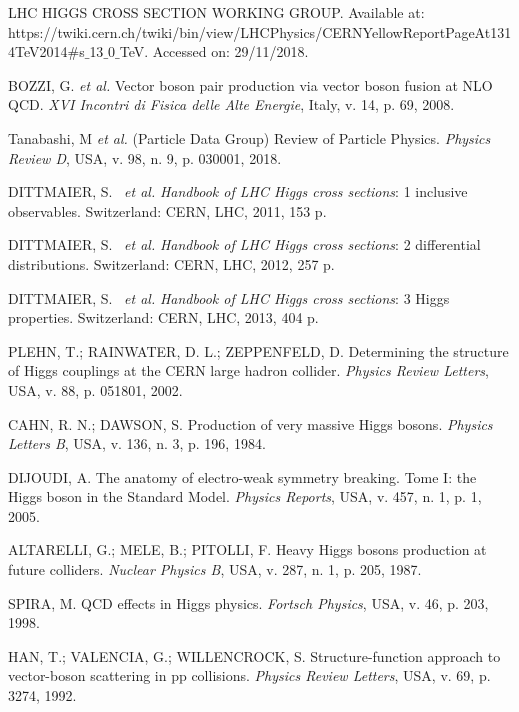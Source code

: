 \begin{thebibliography}{}
LHC HIGGS CROSS SECTION WORKING GROUP. Available at: https://twiki.cern.ch/twiki/bin/view/LHCPhysics/CERNYellowReportPageAt1314TeV2014$\#$s$\_$13$\_$0$\_$TeV. Accessed on: 29/11/2018.

BOZZI, G. \textit{et al.} Vector boson pair production via vector boson fusion at NLO QCD. \textit{XVI Incontri di Fisica delle Alte Energie}, Italy, v. 14, p. 69, 2008.

Tanabashi, M \textit{et al.} (Particle Data Group) Review of Particle Physics. \textit{Physics Review D}, USA, v. 98, n. 9, p. 030001, 2018.

DITTMAIER, S. ~\textit{et al.} \textit{Handbook of LHC Higgs cross sections}: 1 inclusive observables. Switzerland: CERN, LHC, 2011, 153 p.

DITTMAIER, S. ~\textit{et al.} \textit{Handbook of LHC Higgs cross sections}: 2 differential distributions. Switzerland: CERN, LHC, 2012, 257 p.

DITTMAIER, S. ~\textit{et al.} \textit{Handbook of LHC Higgs cross sections}: 3 Higgs properties. Switzerland: CERN, LHC, 2013, 404 p.

PLEHN, T.; RAINWATER, D. L.; ZEPPENFELD, D. Determining the structure of Higgs couplings at the CERN large hadron collider. \textit{Physics Review Letters}, USA, v. 88, p. 051801, 2002.

CAHN, R. N.; DAWSON, S. Production of very massive Higgs bosons. \textit{Physics Letters B}, USA, v. 136, n. 3, p. 196, 1984.

DIJOUDI, A. The anatomy of electro-weak symmetry breaking. Tome I: the Higgs boson in the Standard Model. \textit{Physics Reports}, USA, v. 457, n. 1, p. 1, 2005.

ALTARELLI, G.; MELE, B.; PITOLLI, F. Heavy Higgs bosons production at future colliders. \textit{Nuclear Physics B}, USA, v. 287, n. 1, p. 205, 1987.

SPIRA, M. QCD effects in Higgs physics. \textit{Fortsch Physics}, USA, v. 46, p. 203, 1998.

HAN, T.; VALENCIA, G.; WILLENCROCK, S. Structure-function approach to vector-boson scattering in pp collisions. \textit{Physics Review Letters}, USA, v. 69, p. 3274, 1992.


\end{thebibliography}
